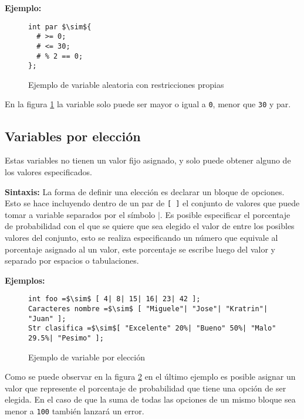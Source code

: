 \textbf{Ejemplo:}

\begin{figure}\begin{lstlisting}[mathescape]
int par $\sim${ 
  # >= 0;
  # <= 30;
  # % 2 == 0;
};
\end{lstlisting}
\caption[Ejemplo de variable con restricciones propias]
{Ejemplo de variable aleatoria con restricciones propias}
\label{ejemplo_variable_aleatoria_con_restricciones_propias}
\end{figure}

En la figura \ref{ejemplo_variable_aleatoria_con_restricciones_propias} la variable 
 solo puede ser mayor o igual a \texttt{0}, menor que \texttt{30} y par.

\subsection{Variables por elección}\label{var:eleccion}
Estas variables no tienen un valor fijo asignado, y solo puede obtener alguno de 
los valores especificados.
	
\textbf{Sintaxis:} La forma de definir una elección es declarar un bloque de 
opciones. Esto se hace incluyendo dentro de un par de \texttt{[ ]} el conjunto de 
valores que puede tomar a variable separados por el símbolo \texttt{$\mid$}.
Es posible especificar el porcentaje de probabilidad con el que se quiere que
sea elegido el valor de entre los posibles valores del conjunto, esto se realiza 
especificando un número que equivale al porcentaje asignado al un valor, este 
porcentaje se escribe luego del valor y separado por espacios o tabulaciones.
	
\textbf{Ejemplos:}
\begin{figure}[h]
\begin{lstlisting}[mathescape]
int foo =$\sim$ [ 4| 8| 15| 16| 23| 42 ];
Caracteres nombre =$\sim$ [ "Miguele"| "Jose"| "Kratrin"| "Juan" ];
Str clasifica =$\sim$[ "Excelente" 20%| "Bueno" 50%| "Malo" 29.5%| "Pesimo" ];
\end{lstlisting}
\caption[Ejemplo de variable por elección]
{Ejemplo de variable por elección}
\label{ejemplo_variable_por_eleccion}
\end{figure}

Como se puede observar en la figura \ref{ejemplo_variable_por_eleccion} en el 
último ejemplo es posible asignar un valor que represente el porcentaje de 
probabilidad que tiene una opción de ser elegida. 
En el caso de que la suma de todas las opciones de un mismo bloque
sea menor a \texttt{100} también lanzará un error.

